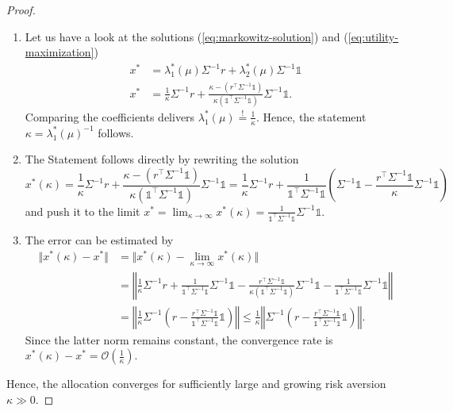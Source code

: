 \documentclass[a4paper, english, 11pt, onecolumn, oneside, final]{article}
\numberwithin{equation}{section}   %
\newcommand{\one}{\mathds 1}
\newcommand{\precision}{\Sigma^{-1}}
\newcommand{\B}{r^\top\Sigma^{-1}\one}
\newcommand{\C}{\one^\top\Sigma^{-1}\one}
\theoremstyle{plain}
\theoremstyle{definition}
\theoremstyle{remark}
\begin{document}
\begin{proof}\mbox{}
    \begin{enumerate}[\itshape(i)]
        \item Let us have a look at the solutions (\ref{eq:markowitz-solution}) and (\ref{eq:utility-maximization})
        \begin{equation*}
            \begin{aligned}
                x^* &= \lambda_1^*(\mu)\precision r + \lambda_2^*(\mu)\precision\one \\
                x^* &= \frac{1}{\kappa}\precision r + \frac{\kappa-(\B)} {\kappa(\C)}\precision\one.
            \end{aligned}
        \end{equation*}
        Comparing the coefficients delivers $\lambda_1^*(\mu) \overset{!}{=} \frac{1}{\kappa}$. Hence, the statement $\kappa = \lambda_1^*(\mu)^{-1}$ follows.
        \item The Statement follows directly by rewriting the solution
        \begin{equation*}
            x^*(\kappa) 
            = \frac{1}{\kappa}\precision r + \frac{\kappa-(\B)}{\kappa(\C)}\precision\one
            = \frac{1}{\kappa}\precision r + \frac{1}{\C}\left(\precision\one - \frac{\B}{\kappa}\precision\one\right)
        \end{equation*}
        and push it to the limit $x^* = \lim_{\kappa\to\infty}x^*(\kappa) = \frac{1}{\C}\precision\one$.
        \item The error can be estimated by
        \begin{equation*}
            \begin{aligned}
                \Vert x^*(\kappa)-x^*\Vert
                &=\Vert x^*(\kappa)-\lim_{\kappa\to\infty}x^*(\kappa)\Vert\\
                &= \left\Vert\frac{1}{\kappa}\precision r+\frac{1}{\C}\precision\one - \frac{\B}{\kappa(\C)}\precision\one -\frac{1}{\C}\precision\one\right\Vert \\
                &= \left\Vert\frac{1}{\kappa}\precision\left(r - \frac{\B}{\C}\one\right)\right\Vert
                \leq \frac{1}{\kappa}\left\Vert\precision\left(r - \frac{\B}{\C}\one\right)\right\Vert.
            \end{aligned}
        \end{equation*}
        Since the latter norm remains constant, the convergence rate is $x^*(\kappa)-x^*=\mathcal{O}(\frac{1}{\kappa})$.
    \end{enumerate}
    Hence, the allocation converges for sufficiently large and growing risk aversion $\kappa\gg0$.
\end{proof}
\end{document}
